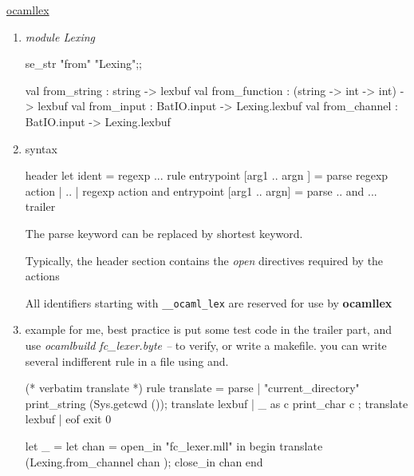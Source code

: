 
\href{http://caml.inria.fr/pub/docs/manual-ocaml/manual026.html}{ocamllex}

\begin{enumerate}
\item \textit{module Lexing}
  \begin{ocamlcode}
    se_str "from" "Lexing";;
  \end{ocamlcode}
  
\begin{ocamlcode}  
  val from_string : string -> lexbuf
  val from_function : (string -> int -> int) -> lexbuf
  val from_input : BatIO.input -> Lexing.lexbuf
  val from_channel : BatIO.input -> Lexing.lexbuf    
\end{ocamlcode}

\item syntax \\

  \begin{bluetext}
    {header}
    let ident = regexp ...
    rule entrypoint [arg1 .. argn ] =
       parse regexp {action }
       | ..
       | regexp {action}
    and entrypoint [arg1 .. argn] =
       parse ..
    and ... 
    {trailer}
  \end{bluetext}

  The parse keyword can be replaced by shortest keyword.

  Typically, the header section contains the \textit{open} directives
  required by the actions

  All identifiers starting with \verb|__ocaml_lex| are reserved for use by
  \textbf{ocamllex}
\item example
  for me, best practice is put some test code in the trailer part, and
  use \textit{ocamlbuild fc\_lexer.byte --} to verify, or write a
  makefile. you can write several indifferent rule in a file using and.

  \begin{bluetext}

(* verbatim translate *)
rule translate = parse 
  | "current_directory" {print_string (Sys.getcwd ()); translate lexbuf}
  | _ as c {print_char c ; translate lexbuf}
  | eof {exit 0}

{
  let _ = 
    let chan = open_in "fc_lexer.mll" in begin
    translate (Lexing.from_channel chan ); 
    close_in chan 
    end 

}
    
\end{bluetext}


\end{enumerate}
